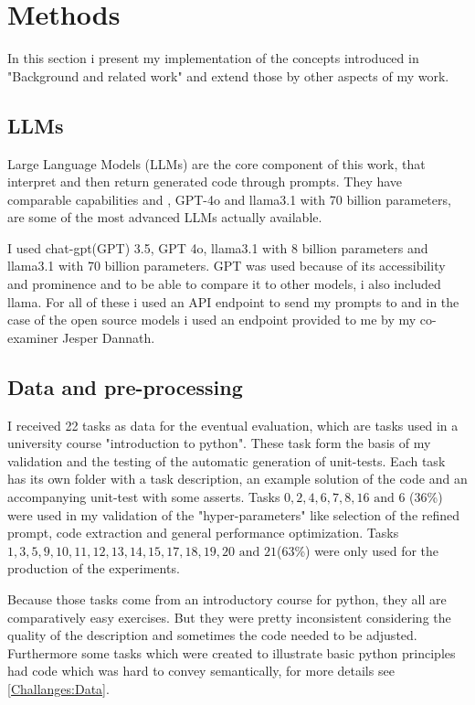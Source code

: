 \documentclass[a4paper,11pt,oneside]{memoir}
\begin{document}
\chapter{Methods}
\label{Methods}
In this section i present my implementation of the concepts introduced in "Background and related work" and extend those by other aspects of my work.

\section{LLMs}
Large Language Models (LLMs) are the core component of this work, that interpret and then return generated code through prompts.
They have comparable capabilities and , GPT-4o and llama3.1 with 70 billion parameters, are some of the most advanced LLMs actually available.

I used chat-gpt(GPT) 3.5, GPT 4o, llama3.1 with 8 billion parameters and llama3.1 with 70 billion parameters. 
GPT was used because of its accessibility and prominence and to be able to compare it to other models, i also included llama. For all of these i used an API endpoint to send my prompts to and in the case of the open source models i used an endpoint provided to me by my co-examiner Jesper Dannath.

\section{Data and pre-processing}
I received 22 tasks as data for the eventual evaluation, which are tasks used in a university course "introduction to python". 
These task form the basis of my validation and the testing of the automatic generation of unit-tests. 
Each task has its own folder with a task description, an example solution of the code and an accompanying unit-test with some asserts. Tasks $0,2,4,6,7,8,16 \text{ and } 6$ (36\%) were used in my validation of the "hyper-parameters" like selection of the refined prompt, code extraction and general performance optimization. 
Tasks $1,3,5,9,10,11,12,13, 14, 15, 17, 18, 19, 20 \text{ and } 21$(63\%) were only used for the production of the experiments.

Because those tasks come from an introductory course for python, they all are 	comparatively easy exercises. But they were pretty inconsistent considering the quality of the description and sometimes the code needed to be adjusted.
Furthermore some tasks which were created to illustrate basic python principles had code which was hard to convey semantically, for more details see \ref{Challanges:Data}.
\end{document}
